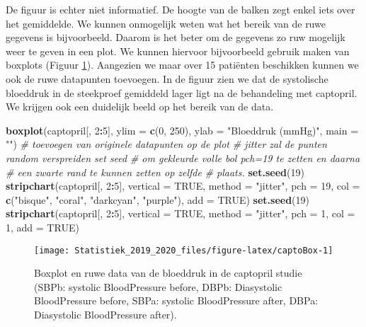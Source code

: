 \documentclass[12pt,dutch,coursenotes]{book}
\newenvironment{Shaded}{\begin{snugshade}}{\end{snugshade}}
\newcommand{\KeywordTok}[1]{\textcolor[rgb]{0.13,0.29,0.53}{\textbf{#1}}}
\newcommand{\DataTypeTok}[1]{\textcolor[rgb]{0.13,0.29,0.53}{#1}}
\newcommand{\DecValTok}[1]{\textcolor[rgb]{0.00,0.00,0.81}{#1}}
\newcommand{\StringTok}[1]{\textcolor[rgb]{0.31,0.60,0.02}{#1}}
\newcommand{\CommentTok}[1]{\textcolor[rgb]{0.56,0.35,0.01}{\textit{#1}}}
\newcommand{\OtherTok}[1]{\textcolor[rgb]{0.56,0.35,0.01}{#1}}
\newcommand{\OperatorTok}[1]{\textcolor[rgb]{0.81,0.36,0.00}{\textbf{#1}}}
\newcommand{\NormalTok}[1]{#1}
\theoremstyle{definition}
\theoremstyle{definition}
\theoremstyle{definition}
\theoremstyle{remark}
\begin{document}
De figuur is echter niet informatief. De hoogte van de balken zegt enkel
iets over het gemiddelde. We kunnen onmogelijk weten wat het bereik van
de ruwe gegevens is bijvoorbeeld. Daarom is het beter om de gegevens zo
ruw mogelijk weer te geven in een plot. We kunnen hiervoor bijvoorbeeld
gebruik maken van boxplots (Figuur \ref{fig:captoBox}). Aangezien we
maar over 15 patiënten beschikken kunnen we ook de ruwe datapunten
toevoegen. In de figuur zien we dat de systolische bloeddruk in de
steekproef gemiddeld lager ligt na de behandeling met captopril. We
krijgen ook een duidelijk beeld op het bereik van de data.

\begin{Shaded}
\begin{Highlighting}[]
\KeywordTok{boxplot}\NormalTok{(captopril[, }\DecValTok{2}\OperatorTok{:}\DecValTok{5}\NormalTok{], }\DataTypeTok{ylim =} \KeywordTok{c}\NormalTok{(}\DecValTok{0}\NormalTok{, }\DecValTok{250}\NormalTok{), }\DataTypeTok{ylab =} \StringTok{"Bloeddruk (mmHg)"}\NormalTok{, }
    \DataTypeTok{main =} \StringTok{""}\NormalTok{)}
\CommentTok{# toevoegen van originele datapunten op de plot}
\CommentTok{# jitter zal de punten random verspreiden set seed}
\CommentTok{# om gekleurde volle bol pch=19 te zetten en daarna}
\CommentTok{# een zwarte rand te kunnen zetten op zelfde}
\CommentTok{# plaats.}
\KeywordTok{set.seed}\NormalTok{(}\DecValTok{19}\NormalTok{)}
\KeywordTok{stripchart}\NormalTok{(captopril[, }\DecValTok{2}\OperatorTok{:}\DecValTok{5}\NormalTok{], }\DataTypeTok{vertical =} \OtherTok{TRUE}\NormalTok{, }\DataTypeTok{method =} \StringTok{"jitter"}\NormalTok{, }
    \DataTypeTok{pch =} \DecValTok{19}\NormalTok{, }\DataTypeTok{col =} \KeywordTok{c}\NormalTok{(}\StringTok{"bisque"}\NormalTok{, }\StringTok{"coral"}\NormalTok{, }\StringTok{"darkcyan"}\NormalTok{, }
        \StringTok{"purple"}\NormalTok{), }\DataTypeTok{add =} \OtherTok{TRUE}\NormalTok{)}
\KeywordTok{set.seed}\NormalTok{(}\DecValTok{19}\NormalTok{)}
\KeywordTok{stripchart}\NormalTok{(captopril[, }\DecValTok{2}\OperatorTok{:}\DecValTok{5}\NormalTok{], }\DataTypeTok{vertical =} \OtherTok{TRUE}\NormalTok{, }\DataTypeTok{method =} \StringTok{"jitter"}\NormalTok{, }
    \DataTypeTok{pch =} \DecValTok{1}\NormalTok{, }\DataTypeTok{col =} \DecValTok{1}\NormalTok{, }\DataTypeTok{add =} \OtherTok{TRUE}\NormalTok{)}
\end{Highlighting}
\end{Shaded}

\begin{figure}

{\centering \texttt{[image: Statistiek\_2019\_2020\_files/figure-latex/captoBox-1]} 

}

\caption{Boxplot en ruwe data van de bloeddruk in de captopril studie (SBPb: systolic BloodPressure before, DBPb: Diasystolic BloodPressure before, SBPa: systolic BloodPressure after, DBPa: Diasystolic BloodPressure after).}\label{fig:captoBox}
\end{figure}
\end{document}

